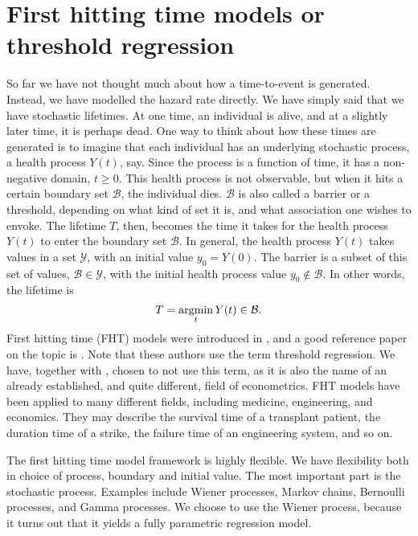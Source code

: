 \section{First hitting time models or threshold regression}
So far we have not thought much about how a time-to-event is generated. Instead, we have modelled the hazard rate directly. We have simply said that we have stochastic lifetimes. At one time, an individual is alive, and at a slightly later time, it is perhaps dead. One way to think about how these times are generated is to imagine that each individual has an underlying stochastic process, a health process $Y(t)$, say. Since the process is a function of time, it has a non-negative domain, $t\geq0$. This health process is not observable, but when it hits a certain boundary set $\mathcal{B}$, the individual dies. $\mathcal{B}$ is also called a barrier or a threshold, depending on what kind of set it is, and what association one wishes to envoke. The lifetime $T$, then, becomes the time it takes for the health process $Y(t)$ to enter the boundary set $\mathcal{B}$. In general, the health process $Y(t)$ takes values in a set $\mathcal{Y}$, with an initial value $y_0=Y(0)$. The barrier is a subset of this set of values, $\mathcal{B}\in\mathcal{Y}$, with the initial health process value $y_0\notin\mathcal{B}$. In other words, the lifetime is
\begin{equation*}
    T=\operatorname*{argmin}_{t}Y(t)\in\mathcal{B}.
\end{equation*}
First hitting time (FHT) models were introduced in \citet{whitmore1986}, and a good reference paper on the topic is \citet{leewhitmore2006}. Note that these authors use the term threshold regression. We have, together with \citet{caroni2017}, chosen to not use this term, as it is also the name of an already established, and quite different, field of econometrics. FHT models have been applied to many different fields, including medicine, engineering, and economics. They may describe the survival time of a transplant patient, the duration time of a strike, the failure time of an engineering system, and so on.

The first hitting time model framework is highly flexible. We have flexibility both in choice of process, boundary and initial value. The most important part is the stochastic process. Examples include Wiener processes, Markov chains, Bernoulli processes, and Gamma processes. We choose to use the Wiener process, because it turns out that it yields a fully parametric regression model.

